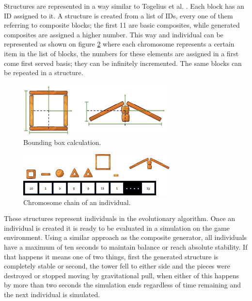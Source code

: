 \documentclass[conference]{IEEEtran}
\begin{document}
    Structures are represented in a way similar to Togelius et al.
    \cite{togelius2016Representationsforsearch-basedmethods}. Each block has
    an ID assigned to it. A structure is created from a list of IDs, every one of them referring to
    composite blocks; the first 11 are basic composites, while generated composites 
    are assigned a higher number.  This way and individual can be
    represented as shown on figure \ref{old_chrom} where each chromosome
    represents a certain item in the list of blocks, the numbers for these
    elements are assigned in a first come first served basis; they can be infinitely incremented. The same blocks can be repeated in a structure.
    
    \begin{figure}[htbp]
    \centerline{\includegraphics[width=80mm]{Images/bounding_box_calculation.png}}
    \caption{Bounding box calculation.}
    \label{bounding_boc_calc}
    \end{figure}
    
    \begin{figure}[htbp]
    \centerline{\includegraphics[width=80mm]{Images/chromosome_chain_example.png}}
    \caption{Chromosome chain of an individual.}
    \label{old_chrom}
    \end{figure}
    
    These structures represent individuals in the evolutionary algorithm. Once
    an individual is created it is ready to be evaluated in a simulation on the
    game environment. %
    Using a similar approach as the composite generator, all
    individuals have a maximum of ten seconds to maintain balance or reach
    absolute stability. If that happens  it means one of two
    things, first the generated structure is completely stable or second, the
    tower fell to either side and the pieces were destroyed or stopped moving by
    gravitational pull, when either of this happens by more than two seconds the
    simulation ends regardless of time remaining and the next individual is
    simulated.
\end{document}
